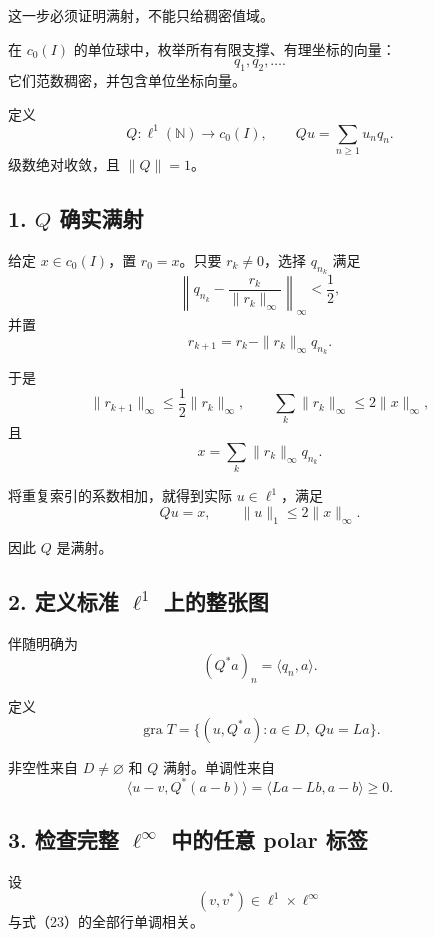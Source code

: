 \documentclass[UTF8,fontset=fandol,11pt,a4paper]{ctexart}
\begin{document}
这一步必须证明满射，不能只给稠密值域。

在 $c_0(I)$ 的单位球中，枚举所有有限支撑、有理坐标的向量： \[
q_1,q_2,\ldots .
\] 它们范数稠密，并包含单位坐标向量。

定义 \[
Q:\ell^1(\mathbb N)\to c_0(I),
\qquad
Qu=\sum_{n\ge1}u_nq_n.
\tag{21}
\] 级数绝对收敛，且 $\|Q\|=1$。

\subsection{\texorpdfstring{1. $Q$ 确实满射}{1. Q 确实满射}}\label{q-ux786eux5b9eux6ee1ux5c04}

给定 $x\in c_0(I)$，置 $r_0=x$。只要 $r_k\ne0$，选择 $q_{n_k}$ 满足 \[
\left\|q_{n_k}-\frac{r_k}{\|r_k\|_\infty}\right\|_\infty<\frac12,
\] 并置 \[
r_{k+1}=r_k-\|r_k\|_\infty q_{n_k}.
\]

于是 \[
\|r_{k+1}\|_\infty\le\frac12\|r_k\|_\infty,
\qquad
\sum_k\|r_k\|_\infty\le2\|x\|_\infty,
\] 且 \[
x=\sum_k\|r_k\|_\infty q_{n_k}.
\]

将重复索引的系数相加，就得到实际 $u\in\ell^1$，满足 \[
\boxed{
Qu=x,\qquad\|u\|_1\le2\|x\|_\infty.
}
\tag{22}
\]

因此 $Q$ 是满射。

\subsection{\texorpdfstring{2. 定义标准 $\ell^1$ 上的整张图}{2. 定义标准 \textbackslash ell\^{}1 上的整张图}}\label{ux5b9aux4e49ux6807ux51c6-ell1-ux4e0aux7684ux6574ux5f20ux56fe}

伴随明确为 \[
(Q^*a)_n=\langle q_n,a\rangle.
\]

定义 \[
\boxed{
\operatorname{gra}T
=
\{(u,Q^*a):a\in D,\ Qu=La\}.
}
\tag{23}
\]

非空性来自 $D\ne\varnothing$ 和 $Q$ 满射。单调性来自 \[
\langle u-v,Q^*(a-b)\rangle
=\langle La-Lb,a-b\rangle\ge0.
\]

\subsection{\texorpdfstring{3. 检查完整 $\ell^\infty$ 中的任意 polar 标签}{3. 检查完整 \textbackslash ell\^{}\textbackslash infty 中的任意 polar 标签}}\label{ux68c0ux67e5ux5b8cux6574-ellinfty-ux4e2dux7684ux4efbux610f-polar-ux6807ux7b7e}

设 \[
(v,v^*)\in\ell^1\times\ell^\infty
\] 与式（23）的全部行单调相关。
\end{document}

